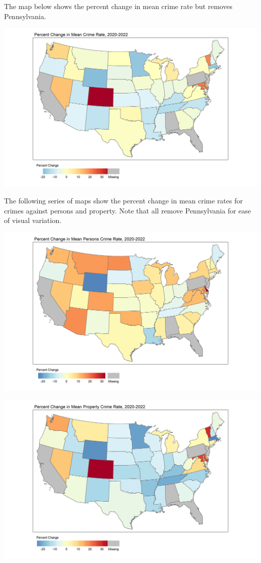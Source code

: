 \documentclass[
  12pt,
]{article}
\begin{document}
The map below shows the percent change in mean crime rate but removes
Pennsylvania.

\includegraphics{Plots/States_noPA.png}

The following series of maps show the percent change in mean crime rates
for crimes against persons and property. Note that all remove
Pennsylvania for ease of visual variation.

\includegraphics{Plots/States_Person_noPA.png}

\includegraphics{Plots/States_Property_noPA.png}
\end{document}
